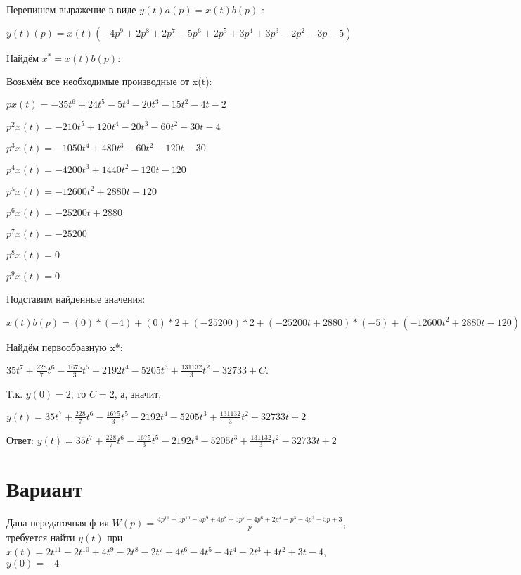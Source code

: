 \documentclass{article}
\begin{document}
{{{{{Перепишем выражение в виде $y(t)a(p)=x(t)b(p)$ :

$y(t)(p)=x(t)(-4p^{9}+2p^{8}+2p^{7}-5p^{6}+2p^{5}+3p^{4}+3p^{3}-2p^{2}-3p-5)$

Найдём $x^*=x(t)b(p)$:

Возьмём все необходимые производные от x(t):

$px(t)=-35t^{6}+24t^{5}-5t^{4}-20t^{3}-15t^{2}-4t-2$

$p^2x(t)=-210t^{5}+120t^{4}-20t^{3}-60t^{2}-30t-4$

$p^3x(t)=-1050t^{4}+480t^{3}-60t^{2}-120t-30$

$p^4x(t)=-4200t^{3}+1440t^{2}-120t-120$

$p^5x(t)=-12600t^{2}+2880t-120$

$p^6x(t)=-25200t+2880$

$p^7x(t)=-25200$

$p^8x(t)=0$

$p^9x(t)=0$

Подставим найденные значения:

$x(t)b(p) = (0)*(-4)+(0)*2+(-25200)*2+(-25200t+2880)*(-5)+(-12600t^{2}+2880t-120)*2+(-4200t^{3}+1440t^{2}-120t-120)*3+(-1050t^{4}+480t^{3}-60t^{2}-120t-30)*3+(-210t^{5}+120t^{4}-20t^{3}-60t^{2}-30t-4)*(-2)+(-35t^{6}+24t^{5}-5t^{4}-20t^{3}-15t^{2}-4t-2)*(-3)+(-35t^{6}+24t^{5}-5t^{4}-20t^{3}-15t^{2}-4t-2)*(-5)=280t^{6}+228t^{5}-3350t^{4}-10960t^{3}-20820t^{2}+131132t$





Найдём первообразную x*:

$35t^{7}+\frac{228}{7}t^{6}-\frac{1675}{3}t^{5}-2192t^{4}-5205t^{3}+\frac{131132}{3}t^{2}-32733+C.$

Т.к. $y(0)=2$, то $C=2$, а, значит, 

$y(t)=35t^{7}+\frac{228}{7}t^{6}-\frac{1675}{3}t^{5}-2192t^{4}-5205t^{3}+\frac{131132}{3}t^{2}-32733t+2$

Ответ: $y(t) = 35t^{7}+\frac{228}{7}t^{6}-\frac{1675}{3}t^{5}-2192t^{4}-5205t^{3}+\frac{131132}{3}t^{2}-32733t+2$

\section{Вариант}

Дана передаточная ф-ия $W(p)=\frac{4p^{11}-5p^{10}-5p^{9}+4p^{8}-5p^{7}-4p^{6}+2p^{4}-p^{3}-4p^{2}-5p+3}{p}$, требуется найти $y(t)$ при $x(t)=2t^{11}-2t^{10}+4t^{9}-2t^{8}-2t^{7}+4t^{6}-4t^{5}-4t^{4}-2t^{3}+4t^{2}+3t-4$, $y(0)=-4$

}}}}}
\end{document}

